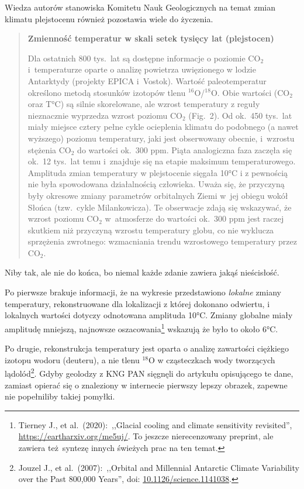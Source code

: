 \documentclass[12pt]{article}
\newcommand{\doi}[1]{doi: \href{htts://doi.org/#1}{#1}}
\begin{document}
Wiedza autorów stanowiska Komitetu Nauk Geologicznych na temat zmian klimatu plejstocenu również pozostawia wiele do życzenia.

\begin{quotation}
	\textbf{Zmienność temperatur w skali setek tysięcy lat (plejstocen)}

	Dla ostatnich 800 tys.~lat są dostępne informacje o poziomie CO$_2$ i~temperaturze oparte o analizę powietrza uwięzionego w lodzie Antarktydy (projekty EPICA i~Vostok). Wartość paleotemperatur określono  metodą stosunków izotopów tlenu $^{16}$O/$^{18}$O. Obie wartości (CO$_2$ oraz T\si{\celsius}) są  silnie skorelowane, ale wzrost temperatury z reguły nieznacznie wyprzedza wzrost poziomu CO$_2$ (Fig.~2). Od ok.~450 tys.~lat miały miejsce cztery pełne cykle ocieplenia klimatu do podobnego (a nawet wyższego) poziomu temperatury, jaki jest obserwowany obecnie, i~wzrostu stężenia CO$_2$ do wartości ok.~300 ppm. Piąta analogiczna faza zaczęła się ok.~12 tys.~lat temu i~znajduje się na etapie maksimum temperaturowego. Amplituda zmian temperatury w plejstocenie sięgała 10\si{\celsius} i z pewnością nie była spowodowana działalnością człowieka. Uważa się, że przyczyną były okresowe zmiany parametrów orbitalnych Ziemi w~jej obiegu wokół Słońca (tzw.~cykle Milankowicza). Te obserwacje zdają się wskazywać, że wzrost poziomu CO$_2$ w~atmosferze do wartości ok.~300 ppm jest raczej skutkiem niż przyczyną wzrostu temperatury globu, co nie wyklucza sprzężenia zwrotnego: wzmacniania trendu wzrostowego temperatury przez CO$_2$.
\end{quotation}

Niby tak, ale nie do końca, bo niemal każde zdanie zawiera jakąś nieścisłość.

Po pierwsze brakuje informacji, że na wykresie przedstawiono \emph{lokalne} zmiany temperatury, rekonstruowane dla lokalizacji z której dokonano odwiertu, i lokalnych wartości dotyczy odnotowana amplituda 10\si{\celsius}. Zmiany globalne miały amplitudę mniejszą, najnowsze oszacowania\footnote{Tierney J., et al.~(2020):~,,Glacial cooling and climate sensitivity revisited'', \href{preprint}{https://eartharxiv.org/me5uj/}. To jeszcze nierecenzowany preprint, ale zawiera też syntezę innych świeżych prac na ten temat.} wskazują że było to około 6\si{\celsius}. 

Po drugie, rekonstrukcja temperatury jest oparta o analizę zawartości ciężkiego izotopu wodoru (deuteru), a nie tlenu $^{18}$O w cząsteczkach wody tworzących lądolód\footnote{Jouzel J., et al.~(2007):~,,Orbital and Millennial Antarctic Climate Variability over the Past 800,000 Years'', \doi{10.1126/science.1141038}.}. Gdyby geolodzy z KNG PAN sięgnęli do artykułu opisującego te dane, zamiast opierać się o znaleziony w internecie pierwszy lepszy obrazek, zapewne nie popełniliby takiej pomyłki.
\end{document}
